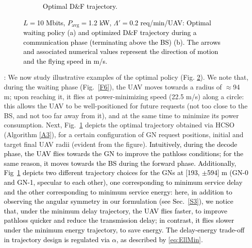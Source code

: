\documentclass[12pt, draftcls, onecolumn]{IEEEtran}
\theoremstyle{plain}
\theoremstyle{definition}
\theoremstyle{remark}
\newcommand\hlt[1]{\textcolor{black}{#1}}
\begin{document}
\begin{figure} [t]
\begin{subfigure}{0.515\linewidth}
      \caption{\hlt{Optimal D\&F trajectory.}}
      \label{F7}
    \end{subfigure}
    \vspace{-6mm}
    \caption{\hlt{$L{=}$10 Mbits, $P_{\mathrm{avg}}{=}$1.2 kW,
    $\Lambda'{=}$0.2 req/min/UAV: Optimal waiting policy (a) and optimized D\&F trajectory during a communication phase 
    (terminating above the BS) (b).
    The arrows and associated numerical values represent the direction of motion and the flying speed in m/s.}}
    \label{Fig4}
\end{figure}

: We now study illustrative examples of the optimal policy (Fig. \ref{Fig4}). We note that, during the waiting phase (Fig.~\ref{F6}), the UAV moves towards a radius of $\approx$94 m; upon reaching it, it flies at power-minimizing speed (22.5 m/s) along a circle: this allows the UAV to be well-positioned for future requests (not too close to the BS, and not too far away from it), and at the same time to minimize its power consumption. Next, Fig.~\ref{F7} depicts the optimal trajectory obtained via HCSO (Algorithm \ref{A3}), for a certain configuration of GN request positions, initial and target final UAV radii (evident from the figure). \hlt{Intuitively, during the decode phase, the UAV flies towards the GN to improve the pathloss conditions; for the same reason, it moves towards the BS during the forward phase. Additionally, Fig~\ref{F7} depicts two different trajectory choices for the GNs at [193, $\pm$594] m (GN-0 and GN-1, specular to each other), one corresponding to minimum service delay and the other corresponding to minimum service energy: here, in addition to observing the angular symmetry in our formulation (see Sec.~\ref{S3}), we notice that, under the minimum delay trajectory, the UAV flies faster, to improve pathloss quicker and reduce the transmission delay; in contrast, it flies slower under the minimum energy trajectory, to save energy.
The delay-energy trade-off in trajectory design is regulated via $\alpha$, as described by \eqref{eq:EllMin}.}
\end{document}

